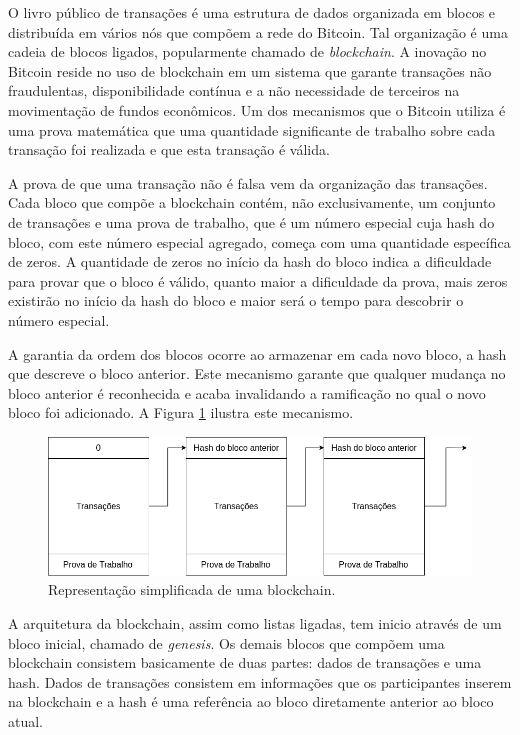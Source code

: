 \documentclass[tcc,capa]{texufpel}
\begin{document}
	O livro público de transações é uma estrutura de dados organizada em blocos e distribuída em vários nós que compõem a rede do Bitcoin. Tal organização é uma cadeia de blocos ligados, popularmente chamado de \textit{blockchain}. A inovação no Bitcoin reside no uso de blockchain em um sistema que garante transações não fraudulentas, disponibilidade contínua e a não necessidade de terceiros na movimentação de fundos econômicos. Um dos mecanismos que o Bitcoin utiliza é uma prova matemática que uma quantidade significante de trabalho sobre cada transação foi realizada e que esta transação é válida. 
	
	A prova de que uma transação não é falsa vem da organização das transações. Cada bloco que compõe a blockchain contém, não exclusivamente, um conjunto de transações e uma prova de trabalho, que é um número especial cuja hash do bloco, com este número especial agregado, começa com uma quantidade específica de zeros. A quantidade de zeros no início da hash do bloco indica a dificuldade para provar que o bloco é válido, quanto maior a dificuldade da prova, mais zeros existirão no início da hash do bloco e maior será o tempo para descobrir o número especial.
	
	A garantia da ordem dos blocos ocorre ao armazenar em cada novo bloco, a hash que descreve o bloco anterior. Este mecanismo garante que qualquer mudança no bloco anterior é reconhecida e acaba invalidando a ramificação no qual o novo bloco foi adicionado. A Figura \ref{fig:blockchain-basica} ilustra este mecanismo.
	
	\begin{figure}[h!]
        \centering
        \includegraphics[width=15cm]{imagens/blockchain-basico.png}
        \caption{Representação simplificada de uma blockchain.}
        \label{fig:blockchain-basica}
    \end{figure}
    
    A arquitetura da blockchain, assim como listas ligadas, tem inicio através de um bloco inicial, chamado de \textit{genesis}. Os demais blocos que compõem uma blockchain consistem basicamente de duas partes: dados de transações e uma hash. Dados de transações consistem em informações que os participantes inserem na blockchain e a hash é uma referência ao bloco diretamente anterior ao bloco atual.
    
\end{document}
